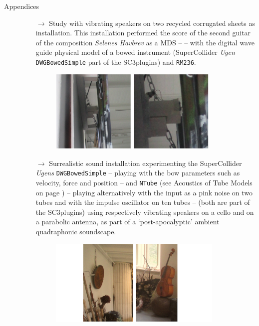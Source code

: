 \begin{description}
\item[Appendices] \hfill 
\begin{itemize}
\item[$\rightarrow$] Study with vibrating speakers on two recycled corrugated sheets as installation. This installation performed the score of the second guitar of the composition \textsl{Selenes Havbrev} as a MDS -- \textsl{} -- with the digital wave guide physical model of a bowed instrument (SuperCollider \textsl{Ugen} \texttt{DWGBowedSimple} part of the SC3plugins) and \texttt{RM236}.\\
\vspace{-4mm}
\begin{figure}[H]
\hfill \includegraphics[width=0.85\textwidth]{mp/img/vs1a}
\end{figure}

\item[$\rightarrow$] Surrealistic sound installation experimenting the SuperCollider \textsl{Ugens} \texttt{DWGBowedSimple} -- playing with the bow parameters such as velocity, force and position --  and \texttt{NTube} (see Acoustics of Tube Models on page \pageref{atm}) -- playing alternatively with the input as a pink noise on two tubes and with the impulse oscillator on ten tubes -- (both are part of the SC3plugins) using respectively vibrating speakers on a cello and on a parabolic antenna, as part of a `post-apocalyptic' ambient quadraphonic soundscape.\\
\vspace{-4mm}
\begin{figure}[H]
\hfill \includegraphics[width=0.87\textwidth]{mp/img/asc}
\end{figure}

\end{itemize}
\end{description}
\vspace{-4mm}


